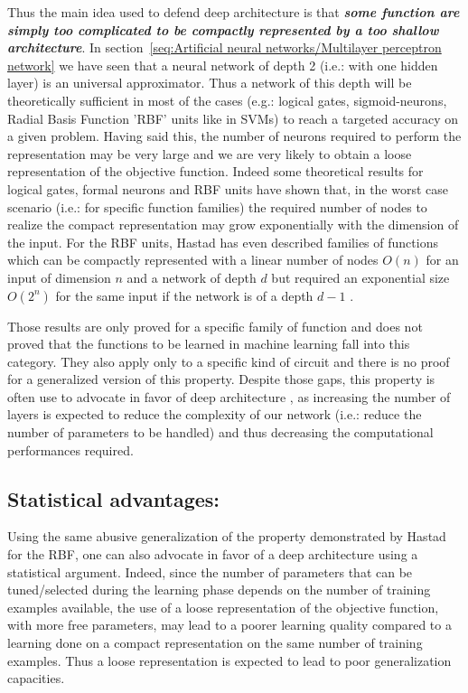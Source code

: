 \documentclass[a4paper,11pt]{report}
\newcommand{\Important}[1]{\textbf{{\em #1}}}
\begin{document}
			Thus the main idea used to defend deep architecture is that \Important{some function are simply too complicated to be compactly represented by a too shallow architecture}. In section~\ref{seq:Artificial neural networks/Multilayer perceptron network} we have seen that a neural network of depth 2 (i.e.: with one hidden layer) is an universal approximator. Thus a network of this depth will be theoretically sufficient in most of the cases (e.g.: logical gates, sigmoid-neurons, Radial Basis Function 'RBF' units like in SVMs) to reach a targeted accuracy on a given problem. Having said this, the number of neurons required to perform the representation may be very large and we are very likely to obtain a loose representation of the objective function. Indeed some theoretical results for logical gates, formal neurons and RBF units have shown that, in the worst case scenario (i.e.: for specific function families) the required number of nodes to realize the compact representation may grow exponentially with the 
dimension of the input. For the RBF units, Hastad has even described families 
of functions which can be compactly represented with a linear number of nodes $O(n)$ for an input of dimension $n$ and a network of depth $d$ but required an exponential size $O(2^{n})$ for the same input if the network is of a depth $d-1$ \cite{Hastad_1986}.\\\par
      
			Those results are only proved for a specific family of function and does not proved that the functions to be learned in machine learning fall into this category. They also apply only to a specific kind of circuit and there is no proof for a generalized version of this property. Despite those gaps, this property is often use to advocate in favor of deep architecture \cite{Bengio_2009, Ng_course}, as increasing the number of layers is expected to reduce the complexity of our network (i.e.: reduce the number of parameters to be handled) and thus decreasing the computational performances required.
      
		\subsection{Statistical advantages:}
			\label{subseq:Deep neural networks/Advantages of a deep architecture/Statistical advantages}      
			Using the same abusive generalization of the property demonstrated by Hastad for the RBF, one can also advocate in favor of a deep architecture using a statistical argument. Indeed, since the number of parameters that can be tuned/selected during the learning phase depends on the number of training examples available, the use of a loose representation of the objective function, with more free parameters, may lead to a poorer learning quality compared to a learning done on a compact representation on the same number of training examples. Thus a loose representation is expected to lead to poor generalization capacities.\\\par
     
\end{document}
